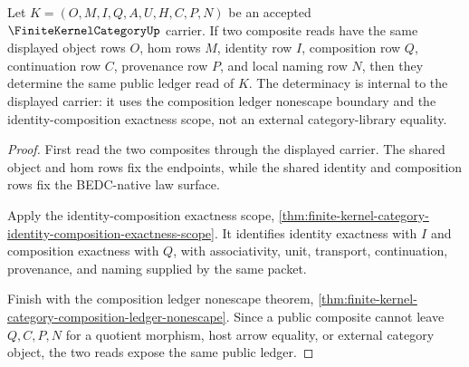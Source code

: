 \begin{theorem}
\label{thm:finite-kernel-category-composite-ledger-determinacy}
Let $K=(O,M,I,Q,A,U,H,C,P,N)$ be an accepted $\FiniteKernelCategoryUp$ carrier.
If two composite reads have the same displayed object rows $O$, hom rows $M$,
identity row $I$, composition row $Q$, continuation row $C$, provenance row
$P$, and local naming row $N$, then they determine the same public ledger read
of $K$. The determinacy is internal to the displayed carrier: it uses the
composition ledger nonescape boundary and the identity-composition exactness
scope, not an external category-library equality.
\end{theorem}
\begin{proof}
First read the two composites through the displayed carrier. The shared object
and hom rows fix the endpoints, while the shared identity and composition rows
fix the BEDC-native law surface.

Apply the identity-composition exactness scope,
\autoref{thm:finite-kernel-category-identity-composition-exactness-scope}. It
identifies identity exactness with $I$ and composition exactness with $Q$, with
associativity, unit, transport, continuation, provenance, and naming supplied by
the same packet.

Finish with the composition ledger nonescape theorem,
\autoref{thm:finite-kernel-category-composition-ledger-nonescape}. Since a
public composite cannot leave $Q,C,P,N$ for a quotient morphism, host arrow
equality, or external category object, the two reads expose the same public
ledger.
\end{proof}

